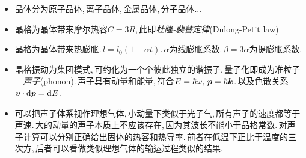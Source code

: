 \begin{itemize}
	\item 晶体分为原子晶体,\,离子晶体,\,金属晶体,\,分子晶体...
	\item 晶格为晶体带来摩尔热容$C=3R$,\,此即\emph{杜隆-裴替定律}(Dulong-Petit law)
	\item 晶格为晶体带来热膨胀.\,$l=l_0(1+\alpha t)$.\,$\alpha$为线膨胀系数.\,$\beta=3\alpha$为提膨胀系数.
	\item 晶格振动为集团模式,\,可约化为一个个彼此独立的谐振子,\,量子化即成为准粒子---\emph{声子}(phonon).\,声子具有动量和能量,\,符合$E=\hbar\omega,\,\boldsymbol{p}=\hbar\boldsymbol{k}$.\,以及色散关系$\boldsymbol{v}\cdot \textrm{d} \boldsymbol{p}=\textrm{d} E$.
	\item 可以把声子体系视作理想气体,\,小动量下类似于光子气,\,所有声子的速度都等于声速.\,大的动量的声子本质上不应该存在,\,因为其波长不能小于晶格常数.\,对声子计算可以分别正确给出固体的热容和热导率.\,前者在低温下正比于温度的三次方,\,后者可以看做类似理想气体的输运过程类似的结果.
\end{itemize}


